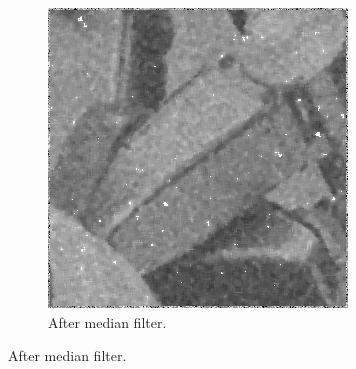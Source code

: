 \begin{figure}[H]
\centering
  \begin{subfigure}{\linewidth}
  \centering
    \includegraphics[width = \cutOutWidth]{graphics/complex2_median.png}
    \caption{After median filter.}
    \label{fig:complex2_median}
  \end{subfigure}
  

\end{figure}
